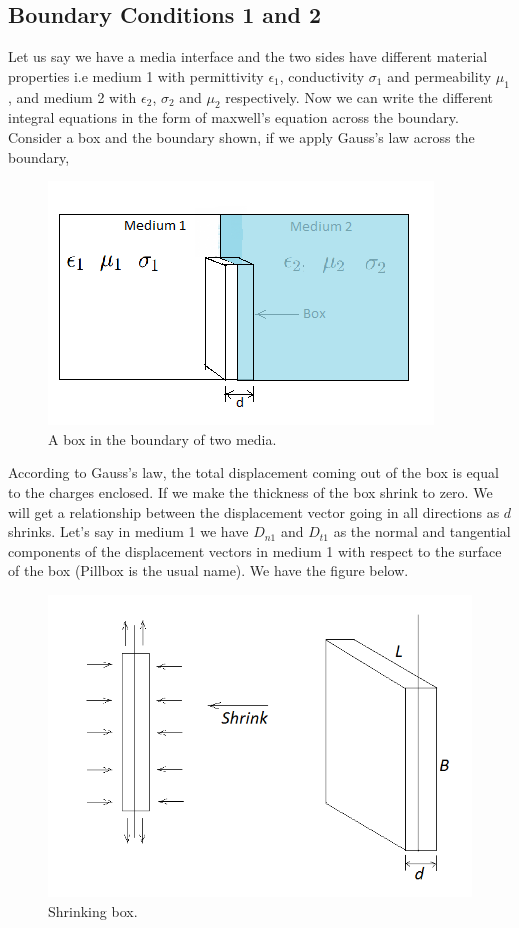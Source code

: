 \subsection{Boundary Conditions 1 and 2}
Let us say we have a media interface and the two sides have different material properties i.e medium 1 with permittivity $\epsilon_1$, conductivity $\sigma_1$ and permeability $\mu_1$, and medium 2 with $\epsilon_2$, $\sigma_2$ and $\mu_2$ respectively. Now we can write the different integral equations in the form of maxwell's equation across the boundary. Consider a box and the boundary shown, if we apply Gauss's law across the boundary,
\begin{figure}[h]
\centering
\includegraphics[width=1\linewidth]{./graphics/diemedium1}
\caption{A box in the boundary of two media.}
\end{figure}

According to Gauss's law, the total displacement coming out of the box is equal to the charges enclosed. If we make the thickness of the box shrink to zero. We will get a relationship between the displacement vector going in all directions as $d$ shrinks.  Let's say in medium 1 we have $D_{n1}$ and $D_{t1}$ as the normal and tangential components of the displacement vectors in medium 1 with respect to the surface of the box (Pillbox is the usual name). We have the figure below.
\begin{figure}[h]
\centering
\includegraphics[width=.7\linewidth]{./graphics/diemedium2}
\caption{Shrinking box.}
\end{figure}

